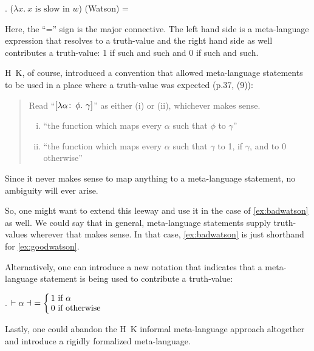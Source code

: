 \ex. ($\lambda x.\ x \mbox{ is slow in } w$) (Watson) = 

Here, the ``='' sign is the major connective. The left hand side is a
meta-language expression that resolves to a truth-value and the right hand
side %
%
as well contributes a truth-value: 1 if such and such and 0 if such and such.

H\amp\ K, of course, introduced a convention that allowed meta-language
statements to be used in a place where a truth-value was expected (p.37, (9)):

\begin{quote}
  Read ``$[\lambda \alpha\co \phi.\ \gamma]$'' as either (i) or (ii),
  whichever makes sense.
  \begin{enumerate}[(i)]
  \item ``the function which maps every $\alpha$ such that $\phi$ to
    $\gamma$''
  \item ``the function which maps every $\alpha$ such that $\gamma$ to
    1, if $\gamma$, and to 0 otherwise''
  \end{enumerate}
\end{quote}
%
Since it never makes sense to map anything to a meta-language statement, no
ambiguity will ever arise.

So, %
%
one might want to extend this leeway and use it in the case of
\ref{ex:badwatson} as well. We could say that in general, meta-language
statements supply truth-values wherever that makes sense. In that case,
\ref{ex:badwatson} is just shorthand for \ref{ex:goodwatson}.

\newcommand{\nupsis}[1]{\ensuremath{\vdash #1 \dashv}}

Alternatively, %
%
one can introduce a new notation that indicates that a meta-language statement
is being used to contribute a truth-value:

\ex. $\nupsis{\alpha}\ = \leftchoice{1 if $\alpha$,0 if otherwise}$

Lastly, one could abandon the H\amp\ K informal meta-language approach
altogether and introduce a rigidly formalized meta-language.

